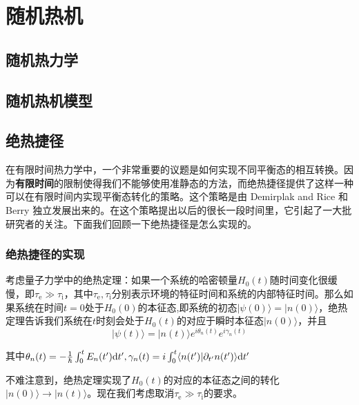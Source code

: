 \chapter{随机热机}
\section{随机热力学}

\section{随机热机模型}

\section{绝热捷径}


\qquad 在有限时间热力学中，一个非常重要的议题是如何实现不同平衡态的相互转换。因为\textbf{有限时间}的限制使得我们不能够使用准静态的方法，而绝热捷径\cite{Chen2010}提供了这样一种可以在有限时间内实现平衡态转化的策略。这个策略是由 Demirplak and Rice \cite{Demirplak2003}和 Berry \cite{Berry2009} 独立发展出来的。在这个策略提出以后的很长一段时间里，它引起了一大批研究者的关注。下面我们回顾一下绝热捷径是怎么实现的。


\subsection{绝热捷径的实现}


\qquad 考虑量子力学中的绝热定理\cite{Griffiths2018}：如果一个系统的哈密顿量$H_0(t)$随时间变化很缓慢，即$\tau_\mathrm{e} \gg \tau_\mathrm{i}$，其中$\tau_\mathrm{e}, \tau_\mathrm{i}$分别表示环境的特征时间和系统的内部特征时间。那么如果系统在时间$t=0$处于$H_0 (0)$的本征态,即系统的初态$| \psi(0) \rangle = | n(0) \rangle$，绝热定理告诉我们系统在$t$时刻会处于$H_0 (t)$的对应于瞬时本征态$| n(0) \rangle$，并且
\begin{equation}
    |\psi(t)\rangle=|n(t)\rangle e^{i \theta_{n}(t)} e^{i \gamma_{n}(t)}
    \label{eq2.1}
\end{equation}

其中$\theta_{n}(t)=-\frac{1}{\hbar} \int_{0}^{t} E_{n}(t^{\prime}) \mathrm{d} t^{\prime}, \gamma_{n}(t)=i \int_{0}^{t}\langle n(t^{\prime}) | \partial_{t^{\prime}}n(t^{\prime})\rangle \mathrm{d} t^{\prime}$

不难注意到，绝热定理实现了$H_0(t)$的对应的本征态之间的转化$| n(0) \rangle \to | n(t) \rangle$。现在我们考虑取消$\tau_\mathrm{e} \gg \tau_\mathrm{i}$的要求。


